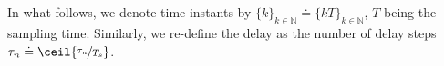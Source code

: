 
\section{}\label{sec:disc-time}

In what follows, we denote time instants by $ \{k\}_{k\in\mathbb{N}} \doteq \{kT\}_{k\in\mathbb{N}} $,
$ T $ being the sampling time.
Similarly, we re-define the delay as the number of delay steps $ \taun \doteq \ceil{\nicefrac{\taun}{T_s}} $.